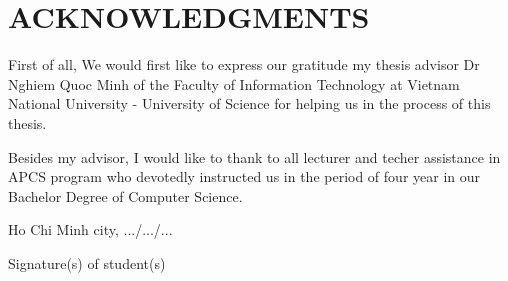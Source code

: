 \chapter*{ACKNOWLEDGMENTS}
\label{thanks}

First of all, We would first like to express our gratitude my thesis advisor Dr Nghiem Quoc Minh of the Faculty of Information Technology at Vietnam National University - University of Science for helping us in the process of this thesis.

Besides my advisor, I would like to thank to all lecturer and techer assistance in APCS program who devotedly instructed us in the period of four year in our Bachelor Degree of Computer Science. 




\vspace{3cm}
\hspace{7cm}
\begin{minipage}[ht]{0.48\textwidth}
\begin{center}
Ho Chi Minh city, .../.../...

Signature(s) of student(s) 

\tenSV  ~~~~~~~   \tenSVt 
\end{center}
\end{minipage}
